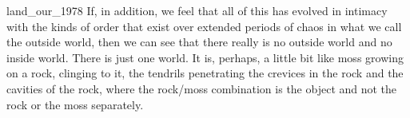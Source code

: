 \documentclass[12pt,phd,a4paper,twoside]{ucl_thesis}
\begin{document}











 



\clearpage


\hspace{0pt}
\vfill
\begin{citequote}{land_our_1978}
If, in addition, we feel that all of this has evolved in intimacy with the kinds of order that exist over extended periods of chaos in what we call the outside world, then we can see that there really is no outside world and no inside world. There is just one world. It is, perhaps, a little bit like moss growing on a rock, clinging to it, the tendrils penetrating the crevices in the rock and the cavities of the rock, where the rock/moss combination is the object and not the rock or the moss separately.
\end{citequote}
\vfill
\hspace{0pt}
\end{document}
